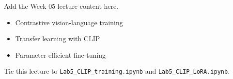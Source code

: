 Add the Week 05 lecture content here.

\begin{itemize}
  \item Contrastive vision-language training
  \item Transfer learning with CLIP
  \item Parameter-efficient fine-tuning
\end{itemize}

Tie this lecture to \texttt{Lab5\_CLIP\_training.ipynb} and \texttt{Lab5\_CLIP\_LoRA.ipynb}.
